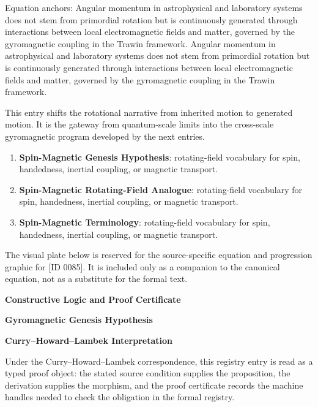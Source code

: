 Equation anchors: Angular momentum in astrophysical and laboratory systems does not stem from primordial rotation but is continuously generated through interactions between local electromagnetic fields and matter, governed by the gyromagnetic coupling in the Trawin framework. Angular momentum in astrophysical and laboratory systems does not stem from primordial rotation but is continuously generated through interactions between local electromagnetic fields and matter, governed by the gyromagnetic coupling in the Trawin framework.

This entry shifts the rotational narrative from inherited motion to generated motion. It is the gateway from quantum-scale limits into the cross-scale gyromagnetic program developed by the next entries.
\endgroup

\begingroup\footnotesize\sloppy
\begin{enumerate}[leftmargin=1.35em,itemsep=1pt,topsep=1pt,parsep=0pt]
\item \textbf{Spin-Magnetic Genesis Hypothesis}: rotating-field vocabulary for spin, handedness, inertial coupling, or magnetic transport.
\item \textbf{Spin-Magnetic Rotating-Field Analogue}: rotating-field vocabulary for spin, handedness, inertial coupling, or magnetic transport.
\item \textbf{Spin-Magnetic Terminology}: rotating-field vocabulary for spin, handedness, inertial coupling, or magnetic transport.
\end{enumerate}
\endgroup

\begingroup\footnotesize\sloppy
The visual plate below is reserved for the source-specific equation and progression graphic for [ID 0085]. It is included only as a companion to the canonical equation, not as a substitute for the formal text.
\par\endgroup
\ifTZPDarkEdition
{}
\fi

\clearpage
\begingroup\tzpsupportsetup
\noindent\textbf{\fontsize{10.8pt}{12.8pt}\selectfont [ID 0085] Constructive Logic and Proof Certificate}\par
\noindent\textbf{\fontsize{10pt}{12pt}\selectfont Gyromagnetic Genesis Hypothesis}\par
\vspace{0.45em}
\begingroup
\footnotesize
\setlength{\parskip}{0.22em}
\setlength{\parindent}{0pt}
\noindent\textbf{Curry--Howard--Lambek Interpretation}\par
Under the Curry--Howard--Lambek correspondence, this registry entry is read as a typed proof
object: the stated source condition supplies the proposition, the derivation supplies the
morphism, and the proof certificate records the machine handles needed to check the obligation
in the formal registry.


